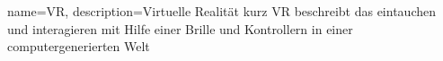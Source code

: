 \makeglossaries

{
    name=VR,
    description={Virtuelle Realität kurz VR beschreibt das eintauchen und interagieren mit Hilfe einer Brille und Kontrollern in einer computergenerierten Welt}
}